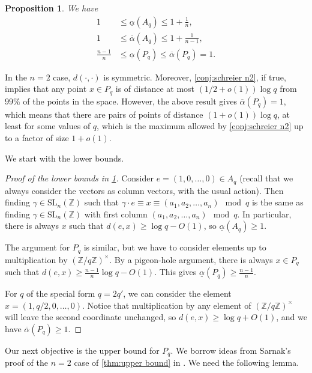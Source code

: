 \documentclass[12pt, a4paper]{amsart}
\numberwithin{equation}{section}
\newtheorem{prop}[theorem]{Proposition}
\theoremstyle{definition}
\newcommand{\Z}{\mathbb{Z}}
\newcommand{\SL}{\mathrm{SL}}
\begin{document}
\begin{prop}\label{prop:affine and projective}
We have
\begin{align*}
1&\le\underline{\alpha}(A_q)\le 1+\frac{1}{n},\\
1&\le\overline{\alpha}(A_q)\le 1+\frac{1}{n-1},\\
\frac{n-1}{n}&\le\underline{\alpha}(P_q)\le\overline{\alpha}(P_q)=1.
\end{align*}
\end{prop}

In the $n=2$ case, $d(\cdot,\cdot)$ is symmetric.
Moreover, \cref{conj:schreier n2}, if true, implies that any point $x\in P_q$
is of distance at most $(1/2+o(1))\log q$ from $99\%$ of the points in the space.
However, the above result gives $\overline{\alpha}(P_q)=1$, which means that there
are pairs of points of distance $(1+o(1))\log q$, at least
for some values of $q$, which is the maximum allowed by 
\cref{conj:schreier n2} up to a factor of size $1+o(1)$.

We start with the lower bounds.
\begin{proof}[Proof of the lower bounds in \cref{prop:affine and projective}]
Consider $e= (1,0,\ldots,0)\in A_q$ (recall that we always consider the vectors as column vectors, with the usual action). Then finding $\gamma \in \SL_n(\Z)$ such that $\gamma \cdot e\equiv x\equiv (a_1,a_2,\ldots,a_n)\mod q$ is the same as finding $\gamma \in \SL_n(\Z)$ with first column $(a_1,a_2,\ldots,a_n)\mod q$. In particular, there is always $x$ such that $d(e,x)\ge \log q-O(1)$, so 
$\underline{\alpha}(A_q)\ge 1$.
 
The argument for $P_q$  is similar, but we have to consider elements up to multiplication by $(\Z/q\Z)^\times$. By a pigeon-hole argument, there is always $x \in P_q$ such that $d(e,x)\ge \frac{n-1}{n} \log q-O(1)$.
This gives $\underline{\alpha}(P_q) \ge \frac{n-1}{n}$.

For $q$ of the special form $q=2q'$,
we can consider the element $x=(1,q/2,0,\ldots,0)$.
Notice that multiplication by any element of $(\Z/q\Z)^\times$
will leave the second coordinate unchanged, so $d(e,x)\ge \log q +O(1)$, and we
have
$\overline{\alpha}(P_q) \ge 1$.
\end{proof}

Our next objective is the upper bound for $P_q$.
We borrow ideas from Sarnak's proof of the $n=2$ case of \cref{thm:upper bound}
in \cite{sarnak2015lettermiller}.
We need the following lemma.
 
\end{document}
